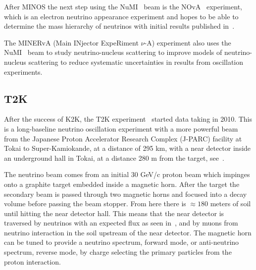 After MINOS the next step using the NuMI~\cite{19NuMI} beam is the NOvA~\cite{18nova} experiment, which is an electron neutrino appearance experiment and hopes to be able to determine the mass hierarchy of neutrinos with initial results published in~\cite{103NOVA}.

The MINERvA (Main INjector ExpeRiment $\nu$-A) experiment \cite{39minerva} also uses the NuMI~\cite{19NuMI} beam to study neutrino-nucleus scattering to improve models of neutrino-nucleus scattering to reduce systematic uncertainties in results from oscillation experiments.


\subsection{T2K}


After the success of K2K, the T2K experiment~\cite{21T2K} started data taking in 2010. This is a long-baseline neutrino oscillation experiment with a more powerful beam from the Japanese Proton Accelerator Research Complex (J-PARC) facility at Tokai to Super-Kamiokande, at a distance of 295 km, with a near detector inside an underground hall in Tokai, at a distance 280 m from the target, see~.

The neutrino beam comes from an initial 30 GeV/c proton beam which impinges onto a graphite target embedded inside a magnetic horn. After the target the secondary beam is passed through two magnetic horns and focused into a decay volume before passing the beam stopper. From here there is $\approx180$ meters of soil until hitting the near detector hall. This means that the near detector is traversed by neutrinos with an expected flux as seen in~, and by muons from neutrino interaction in the soil upstream of the near detector. The magnetic horn can be tuned to provide a neutrino spectrum, forward mode, or anti-neutrino spectrum, reverse mode, by charge selecting the primary particles from the proton interaction.



